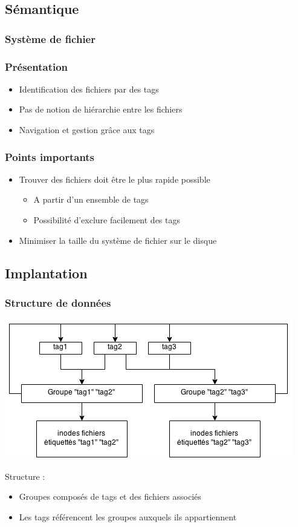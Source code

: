 \documentclass{beamer}
\begin{document}
\subsection{Sémantique}

\begin{frame}
  \frametitle{Système de fichier}
\end{frame}


\begin{frame}
  \frametitle{Présentation}
  \begin{itemize}
  \item Identification des fichiers par des tags
  \item Pas de notion de hiérarchie entre les fichiers
  \item Navigation et gestion grâce aux tags
  \end{itemize}
\end{frame}

\begin{frame}
  \frametitle{Points importants}
  \begin{itemize}
  \item Trouver des fichiers doit être le plus rapide possible
    \begin{itemize}
      \item A partir d'un ensemble de tags
      \item Possibilité d'exclure facilement des tags
    \end{itemize}
  \item Minimiser la taille du système de fichier sur le disque
  \end{itemize}
\end{frame}

\subsection{Implantation}
\begin{frame}
  \frametitle{Structure de données}
  \begin{center}
  \includegraphics[scale=0.4]{fs_data.png}
  \end{center}
  Structure :
  \begin{itemize}
  \item Groupes composés de tags et des fichiers associés
  \item Les tags référencent les groupes auxquels ils appartiennent
  \end{itemize}
\end{frame}
\end{document}

